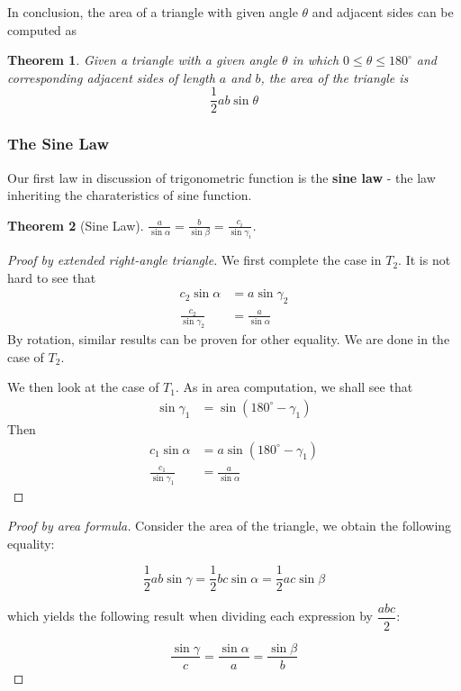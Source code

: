 \documentclass[12pt]{article}
\newtheorem*{theorem}{Theorem}
\begin{document}
    In conclusion, the area of a triangle with given angle $\theta$ and adjacent sides can be computed as 

    \begin{theorem}
        Given a triangle with a given angle $\theta$ in which $0\leq \theta\leq 180^\circ$ and corresponding adjacent sides of length $a$ and $b$, the area of the triangle is $$\frac{1}{2}ab\sin{\theta}$$
    \end{theorem}

    \subsubsection*{The Sine Law}

    Our first law in discussion of trigonometric function is the \textbf{sine law} - the law inheriting the charateristics of sine function.

    \begin{theorem}[Sine Law]
        $\displaystyle \frac{a}{\sin{\alpha}}=\frac{b}{\sin{\beta}}=\frac{c_i}{\sin{\gamma_i}}$.
    \end{theorem}

    \begin{proof}[Proof by extended right-angle triangle]
        We first complete the case in $T_2$. It is not hard to see that \begin{align*}
            c_2\sin{\alpha}&=a\sin{\gamma_2}\\
            \frac{c_2}{\sin{\gamma_2}}&=\frac{a}{\sin{\alpha}}
        \end{align*}
        By rotation, similar results can be proven for other equality. We are done in the case of $T_2$.

        We then look at the case of $T_1$. As in area computation, we shall see that \begin{align*}
            \sin{\gamma_1}&=\sin(180^\circ - \gamma_1)
        \end{align*}
        Then \begin{align*}
            c_1\sin{\alpha}&=a\sin(180^\circ - \gamma_1)\\
            \frac{c_1}{\sin{\gamma_1}}&=\frac{a}{\sin{\alpha}}
        \end{align*}
    \end{proof}

    \begin{proof}[Proof by area formula]
        Consider the area of the triangle, we obtain the following equality:

        $$\frac{1}{2}ab\sin{\gamma}=\frac{1}{2}bc\sin{\alpha}=\frac{1}{2}ac\sin{\beta}$$

        which yields the following result when dividing each expression by $\dfrac{abc}{2}$:

        $$\frac{\sin{\gamma}}{c}=\frac{\sin{\alpha}}{a}=\frac{\sin{\beta}}{b}$$
    \end{proof}
\end{document}
